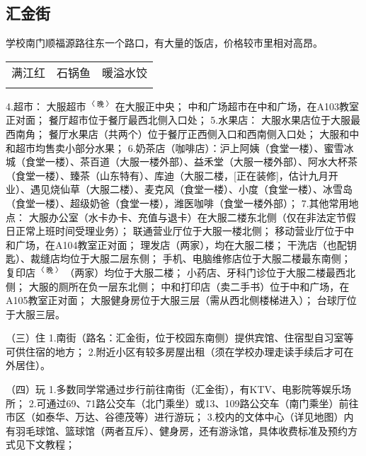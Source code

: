 \subsection[汇金街]{汇金街}
学校南门顺福源路往东一个路口，有大量的饭店，价格较市里相对高昂。
\begin{table}[ht]
    \centering
    \begin{tabular}{|c|c|c|}
        \Xhline{1.2pt}
        满江红 & 石锅鱼 & 暖溢水饺 \\
        \Xhline{1.2pt}
    \end{tabular}
\end{table}
4.超市：
大服超市$^{〈晚〉}$在大服正中央；
中和广场超市在中和广场，在A103教室正对面；
餐厅超市位于餐厅最西北侧入口处；
5.水果店：
大服水果店位于大服最西南角；
餐厅水果店（共两个）位于餐厅正西侧入口和西南侧入口处；
大服和中和超市均售卖小部分水果；
6.奶茶店（咖啡店）：沪上阿姨（食堂一楼）、蜜雪冰城（食堂一楼）、茶百道（大服一楼外部）、益禾堂（大服一楼外部）、阿水大杯茶（食堂一楼）、臻茶（山东特有）、库迪（大服二楼，[正在装修]，估计九月开业）、遇见烧仙草（大服二楼）、麦克风（食堂一楼）、小度（食堂一楼）、冰雪岛（食堂一楼）、超级奶爸（食堂一楼），潍医咖啡（食堂一楼外部）；
7.其他常用地点：
大服办公室（水卡办卡、充值与退卡）在大服二楼东北侧（仅在非法定节假日正常上班时间受理业务）；
联通营业厅位于大服一楼北侧；
移动营业厅位于中和广场，在A104教室正对面；
理发店（两家），均在大服二楼；
干洗店（也配钥匙）、裁缝店均位于大服二层东侧；
手机、电脑维修店位于大服二楼最东南侧；
复印店$^{〈晚〉}$（两家）均位于大服二楼；
小药店、牙科门诊位于大服二楼最西北侧；
大服的厕所在负一层东北侧；
中和打印店（卖二手书）位于中和广场，在A105教室正对面；
大服健身房位于大服三层（需从西北侧楼梯进入）；
台球厅位于大服三层。

（三）住
1.南街（路名：汇金街，位于校园东南侧）提供宾馆、住宿型自习室等可供住宿的地方；
2.附近小区有较多房屋出租（须在学校办理走读手续后才可在外居住）。

（四）玩
1.多数同学常通过步行前往南街（汇金街），有KTV、电影院等娱乐场所；
2.可通过69、71路公交车（北门乘坐）或13、109路公交车（南门乘坐）前往市区（如泰华、万达、谷德茂等）进行游玩；
3.校内的文体中心（详见地图）内有羽毛球馆、篮球馆（两者互斥）、健身房，还有游泳馆，具体收费标准及预约方式见下文教程；